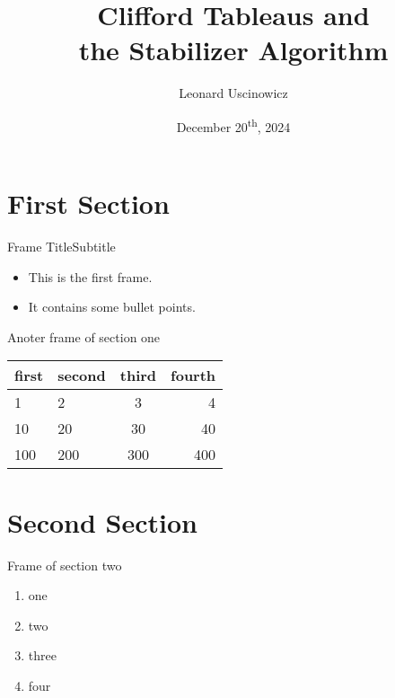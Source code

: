 \documentclass[english,aspectratio=169]{tumbeamer}
\title{Clifford Tableaus and \\ the Stabilizer Algorithm}
\subtitle{}
\author{Leonard Uscinowicz}
\institute{\theChairName\\\theDepartmentName\\\theUniversityName}
\date[20/12/2024]{December 20\textsuperscript{th}, 2024}
\begin{document}
    \renewcommand{\theChairName}{\(\qquad\)}
    \renewcommand{\theDepartmentName}{\(\qquad\)}
    \maketitle

    \section{First Section}
    \begin{frame}{Frame Title}{Subtitle}
        \begin{itemize}
            \item This is the first frame.
            \item It contains some bullet points.
        \end{itemize}
    \end{frame}

    \begin{frame}{Anoter frame of section one}
        \centering
        \vfill
        \begin{tabular}{llcr}
            \toprule
            first & second & third & fourth \\
            \midrule
            1     & 2      & 3     & 4      \\
            10    & 20     & 30    & 40     \\
            100   & 200    & 300   & 400    \\
            \bottomrule
        \end{tabular}
        \vfill
    \end{frame}

    \section{Second Section}
    \begin{frame}{Frame of section two}
        \begin{enumerate}
            \item one
            \item two
            \item three
            \item four
        \end{enumerate}
    \end{frame}
\end{document}

